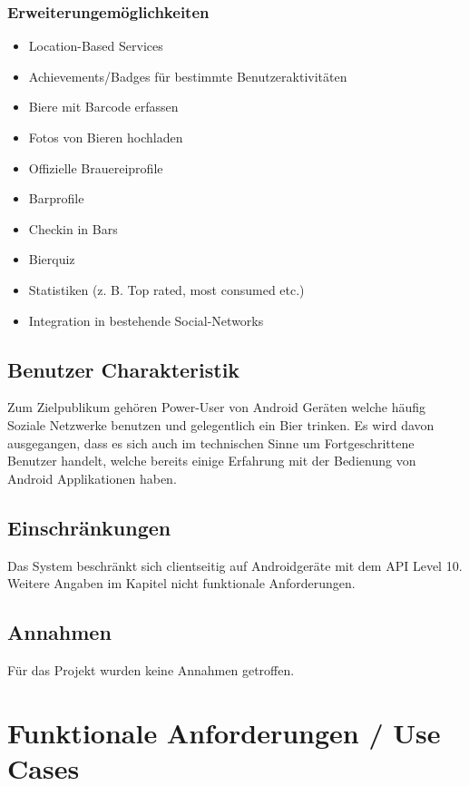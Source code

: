 \documentclass[10pt,a4paper]{scrartcl}
\begin{document}
\subsubsection{Erweiterungemöglichkeiten}
\begin{itemize}
\item Location-Based Services
\item Achievements/Badges für bestimmte Benutzeraktivitäten
\item Biere mit Barcode erfassen
\item Fotos von Bieren hochladen
\item Offizielle Brauereiprofile
\item Barprofile
\item Checkin in Bars
\item Bierquiz
\item Statistiken (z. B. Top rated, most consumed etc.)
\item Integration in bestehende Social-Networks
\end{itemize}

\subsection{Benutzer Charakteristik}
Zum Zielpublikum gehören Power-User von Android Geräten welche häufig Soziale Netzwerke benutzen und gelegentlich ein Bier trinken. Es wird davon ausgegangen, dass es sich auch im technischen Sinne um Fortgeschrittene Benutzer handelt, welche bereits einige Erfahrung mit der Bedienung von Android Applikationen haben.
\subsection{Einschränkungen}
Das System beschränkt sich clientseitig auf Androidgeräte mit dem API Level 10. Weitere Angaben im Kapitel nicht funktionale Anforderungen.
\subsection{Annahmen}
Für das Projekt wurden keine Annahmen getroffen.

\section{Funktionale Anforderungen / Use Cases}
\end{document}
